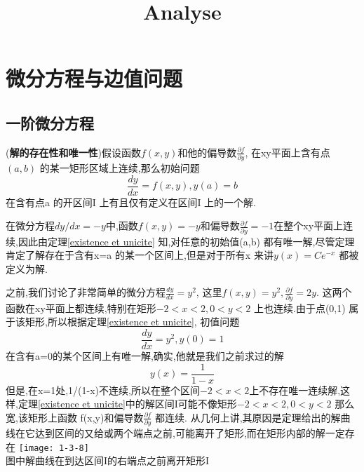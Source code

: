 \documentclass{article}
\begin{document}
\title{Analyse}
\maketitle
\tableofcontents
\newpage

\section{微分方程与边值问题}
\subsection{一阶微分方程}
\begin{theorem}
  ({\bf 解的存在性和唯一性})假设函数$f(x,y)$和他的偏导数$\frac{\partial f}{\partial y}$, 在xy平面上含有点$(a,b)$ 的某一矩形区域上连续,那么初始问题
  \begin{equation}
    \frac{dy}{dx}=f(x,y),y(a)=b
  \end{equation}
  在含有点a 的开区间I 上有且仅有定义在区间I 上的一个解.
  \label{existence et unicite}
\end{theorem}
\begin{example}
  在微分方程$dy/dx=-y$中,函数$f(x,y)=-y$和偏导数$\frac{\partial f}{\partial y}=-1$在整个xy平面上连续,因此由定理\ref{existence et unicite} 知,对任意的初始值(a,b) 都有唯一解,尽管定理肯定了解存在于含有x=a 的某一个区间上,但是对于所有x 来讲$y(x)=Ce^{-x}$ 都被定义为解.
\end{example}
\begin{note}
  之前,我们讨论了非常简单的微分方程$\frac{dy}{dx}=y^2$, 这里$f(x,y)=y^2,\frac{\partial f}{\partial y}=2y$. 这两个函数在xy平面上都连续,特别在矩形$-2<x<2,0<y<2 $ 上也连续.由于点(0,1) 属于该矩形,所以根据定理\ref{existence et unicite}, 初值问题
  \begin{equation}
    \frac{dy}{dx}=y^2,y(0)=1
  \end{equation}
  在含有a=0的某个区间上有唯一解,确实,他就是我们之前求过的解$$y(x)=\frac{1}{1-x}$$
  但是,在x=1处,1/(1-x)不连续,所以在整个区间$-2<x<2 $上不存在唯一连续解,这样,定理\ref{existence et unicite}中的解区间I可能不像矩形$-2<x<2,0<y<2$ 那么宽,该矩形上函数 f(x,y)和偏导数$\frac{\partial f}{\partial y}$ 都连续. 从几何上讲,其原因是定理给出的解曲线在它达到区间的又给或两个端点之前,可能离开了矩形,而在矩形内部的解一定存在 \newline
\texttt{[image: 1-3-8]}\\
图中解曲线在到达区间I的右端点之前离开矩形I
\end{note}
\end{document}
